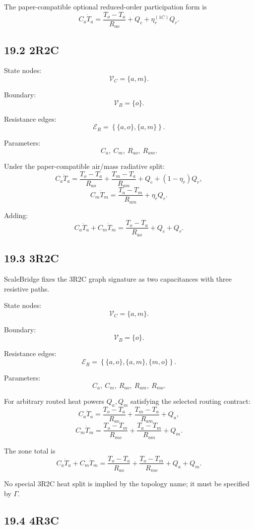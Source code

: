 \documentclass[11pt]{article}
\newcommand{\Vc}{\mathcal{V}_{C}}
\newcommand{\Vb}{\mathcal{V}_{B}}
\newcommand{\Er}{\mathcal{E}_{R}}
\begin{document}
The paper-compatible optional reduced-order participation form is
\[
C_a\dot T_a
=
\frac{T_o-T_a}{R_{ao}}
+
Q_c+\eta_r^{(1C)}Q_r.
\]

\subsection*{19.2 2R2C}

State nodes:
\[
\Vc=\{a,m\}.
\]

Boundary:
\[
\Vb=\{o\}.
\]

Resistance edges:
\[
\Er=
\left\{
\{a,o\},
\{a,m\}
\right\}.
\]

Parameters:
\[
C_a,\ C_m,\ R_{ao},\ R_{am}.
\]

Under the paper-compatible air/mass radiative split:
\[
\boxed{
C_a\dot T_a
=
\frac{T_o-T_a}{R_{ao}}
+
\frac{T_m-T_a}{R_{am}}
+
Q_c
+
(1-\eta_r)Q_r,
}
\tag{E0.3-24}
\]
\[
\boxed{
C_m\dot T_m
=
\frac{T_a-T_m}{R_{am}}
+
\eta_rQ_r.
}
\tag{E0.3-25}
\]

Adding:
\[
\boxed{
C_a\dot T_a+C_m\dot T_m
=
\frac{T_o-T_a}{R_{ao}}+Q_c+Q_r.
}
\tag{E0.3-26}
\]

\subsection*{19.3 3R2C}

ScaleBridge fixes the 3R2C graph signature as two capacitances with three
resistive paths.

State nodes:
\[
\Vc=\{a,m\}.
\]

Boundary:
\[
\Vb=\{o\}.
\]

Resistance edges:
\[
\boxed{
\Er=
\left\{
\{a,o\},
\{a,m\},
\{m,o\}
\right\}.
}
\]

Parameters:
\[
C_a,\ C_m,\ R_{ao},\ R_{am},\ R_{mo}.
\]

For arbitrary routed heat powers $Q_a,Q_m$ satisfying the selected routing
contract:
\[
\boxed{
C_a\dot T_a
=
\frac{T_o-T_a}{R_{ao}}
+
\frac{T_m-T_a}{R_{am}}
+
Q_a,
}
\tag{E0.3-27}
\]
\[
\boxed{
C_m\dot T_m
=
\frac{T_o-T_m}{R_{mo}}
+
\frac{T_a-T_m}{R_{am}}
+
Q_m.
}
\tag{E0.3-28}
\]

The zone total is
\[
\boxed{
C_a\dot T_a+C_m\dot T_m
=
\frac{T_o-T_a}{R_{ao}}
+
\frac{T_o-T_m}{R_{mo}}
+
Q_a+Q_m.
}
\tag{E0.3-29}
\]

No special 3R2C heat split is implied by the topology name; it must be
specified by $\Gamma$.

\subsection*{19.4 4R3C}
\end{document}
